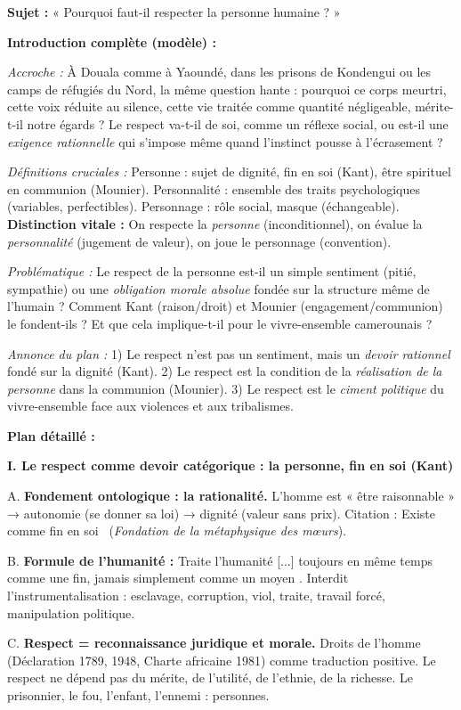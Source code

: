 \documentclass[11pt]{article}
\newcommand{\cle}[1]{{\popxbold\color{popdark}#1}}
\begin{document}
\begin{corrige}
\textbf{Sujet :} « Pourquoi faut-il respecter la personne humaine ? »

\textbf{Introduction complète (modèle) :}
\par \textit{Accroche :} À Douala comme à Yaoundé, dans les prisons de Kondengui ou les camps de réfugiés du Nord, la même question hante : pourquoi ce corps meurtri, cette voix réduite au silence, cette vie traitée comme quantité négligeable, mérite-t-il notre égards ? Le respect va-t-il de soi, comme un réflexe social, ou est-il une \emph{exigence rationnelle} qui s'impose même quand l'instinct pousse à l'écrasement ?
\par \textit{Définitions cruciales :} \cle{Personne} : sujet de dignité, fin en soi (Kant), être spirituel en communion (Mounier). \cle{Personnalité} : ensemble des traits psychologiques (variables, perfectibles). \cle{Personnage} : rôle social, masque (échangeable). \textbf{Distinction vitale :} On respecte la \emph{personne} (inconditionnel), on évalue la \emph{personnalité} (jugement de valeur), on joue le \cle{personnage} (convention).
\par \textit{Problématique :} Le respect de la personne est-il un simple sentiment (pitié, sympathie) ou une \emph{obligation morale absolue} fondée sur la structure même de l'humain ? Comment Kant (raison/droit) et Mounier (engagement/communion) le fondent-ils ? Et que cela implique-t-il pour le vivre-ensemble camerounais ?
\par \textit{Annonce du plan :} 1) Le respect n'est pas un sentiment, mais un \emph{devoir rationnel} fondé sur la dignité (Kant). 2) Le respect est la condition de la \emph{réalisation de la personne} dans la communion (Mounier). 3) Le respect est le \emph{ciment politique} du vivre-ensemble face aux violences et aux tribalismes.

\textbf{Plan détaillé :}

\textbf{I. Le respect comme devoir catégorique : la personne, fin en soi (Kant)}
\par A. \textbf{Fondement ontologique : la rationalité.} L'homme est « être raisonnable » → autonomie (se donner sa loi) → dignité (valeur sans prix). Citation : \guillemotleft Existe comme fin en soi \guillemotright\ (\emph{Fondation de la métaphysique des mœurs}).
\par B. \textbf{Formule de l'humanité :} \guillemotleft Traite l'humanité [...] toujours en même temps comme une fin, jamais simplement comme un moyen \guillemotright. Interdit l'instrumentalisation : esclavage, corruption, viol, traite, travail forcé, manipulation politique.
\par C. \textbf{Respect = reconnaissance juridique et morale.} Droits de l'homme (Déclaration 1789, 1948, Charte africaine 1981) comme traduction positive. Le respect ne dépend pas du mérite, de l'utilité, de l'ethnie, de la richesse. Le prisonnier, le fou, l'enfant, l'ennemi : personnes.


\end{corrige}
\end{document}
